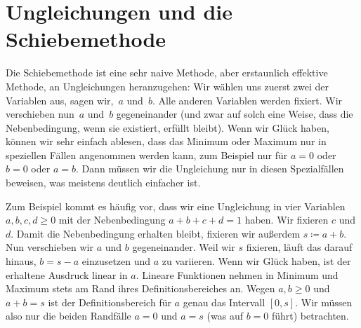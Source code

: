 \section{Ungleichungen und die Schiebemethode}\label{kapitel:Schiebemethode}

Die Schiebemethode ist eine sehr naive Methode, aber erstaunlich effektive Methode, an Ungleichungen heranzugehen: Wir wählen uns zuerst zwei der Variablen aus, sagen wir,~$a$ und~$b$. Alle anderen Variablen werden fixiert. Wir verschieben nun~$a$ und~$b$ gegeneinander (und zwar auf solch eine Weise, dass die Nebenbedingung, wenn sie existiert, erfüllt bleibt). Wenn wir Glück haben, können wir sehr einfach ablesen, dass das Minimum oder Maximum nur in speziellen Fällen angenommen werden kann, zum Beispiel nur für $a=0$ oder $b=0$ oder $a=b$. Dann müssen wir die Ungleichung nur in diesen Spezialfällen beweisen, was meistens deutlich einfacher ist.

Zum Beispiel kommt es häufig vor, dass wir eine Ungleichung in vier Variablen $a,b,c,d\geqslant 0$ mit der Nebenbedingung $a+b+c+d=1$ haben. Wir fixieren $c$ und $d$. Damit die Nebenbedingung erhalten bleibt, fixieren wir außerdem $s\coloneqq a+b$. Nun verschieben wir $a$ und $b$ gegeneinander. Weil wir $s$ fixieren, läuft das darauf hinaus, $b=s-a$ einzusetzen und $a$ zu variieren. Wenn wir Glück haben, ist der erhaltene Ausdruck linear in $a$. Lineare Funktionen nehmen in Minimum und Maximum stets am Rand ihres Definitionsbereiches an. Wegen $a,b\geqslant 0$ und $a+b=s$ ist der Definitionsbereich für $a$ genau das Intervall $[0,s]$. Wir müssen also nur die beiden Randfälle $a=0$ und $a=s$ (was auf $b=0$ führt) betrachten.

